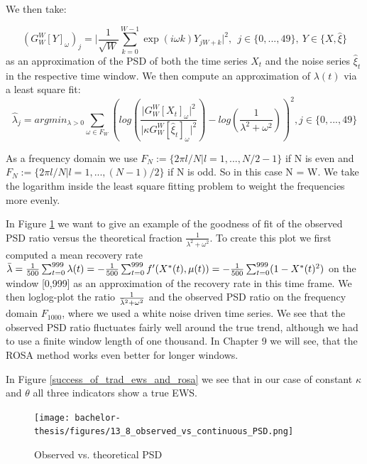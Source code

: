 \documentclass[%
thesis=student,%
coverpage=false,%
titlepage=false,%
headmarks=true, %
english,%
font=libertine, %
math=newpxtx, %
BCOR=5mm,%
coverBCOR=11mm%
]{tumbook}
\begin{document}
We then take:

\[
(G_{W}^{W}[Y]_{\omega})_{j} = \lvert \frac{1}{\sqrt{W}}\sum_{k=0}^{W-1}\exp(i\omega k)Y_{jW + k} \rvert ^2, \ \ j \in \{0,...,49\}, \ Y \in \{X, \widehat{\xi}\}
\]
as an approximation of the PSD of both the time series $X_{t}$ and the noise series $\widehat{\xi}_{t}$ in the respective time window. We then compute an approximation of $\lambda(t)$ via a least square fit:
\[
\widehat{\lambda}_{j} = argmin_{\lambda > 0} \sum_{\omega \in F_{W}} (log(\frac{\lvert G_{W}^{W}[X_{t}]_{\omega}\rvert^2}{\lvert \kappa G_{W}^{W}[\widehat{\xi}_{t}]_{\omega} \rvert^2}) - log(\frac{1}{\lambda^2 + \omega^2}))^2, j \in \{0,...,49\}
\]

As a frequency domain we use $F_{N}:=\{2\pi l/N | l = 1,...,N/2 - 1\}$ if N is even and $F_{N} := \{2\pi l/N | l = 1,...,(N-1)/2 \}$ if N is odd. So in this case N = W. We take the logarithm inside the least square fitting problem to weight the frequencies more evenly. 

In Figure \ref{observed_vs_continuous_PSD} we want to give an example of the goodness of fit of the observed PSD ratio versus the theoretical fraction $\frac{1}{\lambda^2 + \omega^2}$. To create this plot we first computed a mean recovery rate $\Bar{\lambda} = \frac{1}{500}\sum_{t=0}^{999}\lambda(t) = -\frac{1}{500}\sum_{t=0}^{999}f'(X^{*}(t),\mu(t)) = -\frac{1}{500}\sum_{t=0}^{999}(1-X^{*}(t)^2)$ on the window [0,999] as an approximation of the recovery rate in this time frame. We then loglog-plot the ratio $\frac{1}{\Bar{\lambda}^2 + \omega^2}$ and the observed PSD ratio on the frequency domain $F_{1000}$, where we used a white noise driven time series. We see that the observed PSD ratio fluctuates fairly well around the true trend, although we had to use a finite window length of one thousand.
In Chapter 9 we will see, that the ROSA method works even better for longer windows.

In Figure \ref{success_of_trad_ews_and_rosa} we see that in our case of constant $\kappa$ and $\theta$ all three indicators show a true EWS.


\begin{figure}
    \centering
    \texttt{[image: bachelor-thesis/figures/13\_8\_observed\_vs\_continuous\_PSD.png]}
    \caption{Observed vs. theoretical PSD}
    \label{observed_vs_continuous_PSD}
\end{figure}
\end{document}
